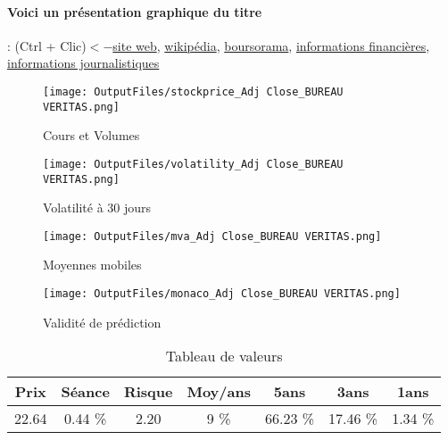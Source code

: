 \documentclass[11pt,a4paper]{report}%
\begin{document}
\paragraph{Voici un présentation graphique du titre} : (Ctrl + Clic)$<-$\href{https://group.bureauveritas.com/fr/investisseurs/informations-financieres/resultats-financiers}{site web}, \href{https://fr.wikipedia.org/wiki/Bureau_Veritas}{wikipédia}, \href{https://www.boursorama.com/cours/1rPBVI}{boursorama}, \href{https://www.qwant.com/?q=site:https:%2f%2fwww.easybourse.com%2faction-societe%2fBUREAU-VERITAS&t=web&client=ext-firefox-hp}{informations financières}, \href{https://bourse.lerevenu.com/cours-de-bourse/fiche-valeur-synthese/BUREAU-VERITAS/BVI-FR}{informations journalistiques}
\begin{figure}[!htb]
   \begin{minipage}{0.5\textwidth}
     \centering
     \texttt{[image: OutputFiles/stockprice\_Adj Close\_BUREAU VERITAS.png]}
     \caption{Cours et Volumes}\label{Fig:price_BUREAU VERITAS}
   \end{minipage}\hfill
   \begin{minipage}{0.5\textwidth}
     \centering
     \texttt{[image: OutputFiles/volatility\_Adj Close\_BUREAU VERITAS.png]}
     \caption{Volatilité à 30 jours}\label{Fig:volat_BUREAU VERITAS}
   \end{minipage}
\end{figure}
\begin{figure}[!htb]
   \begin{minipage}{0.5\textwidth}
     \centering
     \texttt{[image: OutputFiles/mva\_Adj Close\_BUREAU VERITAS.png]}
     \caption{Moyennes mobiles}\label{Fig:mva_BUREAU VERITAS}
   \end{minipage}\hfill
   \begin{minipage}{0.5\textwidth}
     \centering
     \texttt{[image: OutputFiles/monaco\_Adj Close\_BUREAU VERITAS.png]}
     \caption{Validité de prédiction}\label{Fig:prediction_BUREAU VERITAS}
   \end{minipage}
\end{figure}

\begin{table}[H]
  \centering
    \begin{tabular}{|c|c|c|c|c|c|c|}
    \hline
    Prix & Séance & Risque  & Moy/ans & 5ans & 3ans & 1ans \\
    \hline
    22.64 &    0.44 \%    & 2.20 & 9 \% & 66.23 \% & 17.46 \% & 1.34 \% \\
    \hline
    \end{tabular}%
        \label{tab:table_BUREAU VERITAS}%
      \caption{Tableau de valeurs}
\end{table}%
\end{document}
